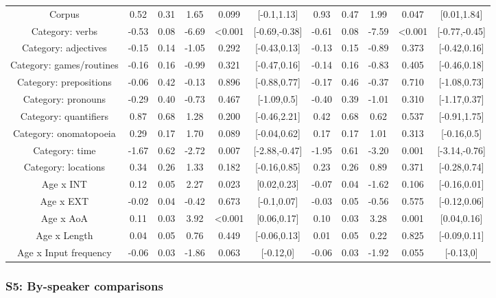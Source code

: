 \documentclass[
  man,floatsintext]{apa6}
\begin{document}
\begin{longtable}[t]{ccccccccccc}
Corpus & 0.52 & 0.31 & 1.65 & 0.099 & {}[-0.1,1.13] & 0.93 & 0.47 & 1.99 & 0.047 & {}[0.01,1.84]\\
Category: verbs & -0.53 & 0.08 & -6.69 & <0.001 & {}[-0.69,-0.38] & -0.61 & 0.08 & -7.59 & <0.001 & {}[-0.77,-0.45]\\
Category: adjectives & -0.15 & 0.14 & -1.05 & 0.292 & {}[-0.43,0.13] & -0.13 & 0.15 & -0.89 & 0.373 & {}[-0.42,0.16]\\
\addlinespace
Category: games/routines & -0.16 & 0.16 & -0.99 & 0.321 & {}[-0.47,0.16] & -0.14 & 0.16 & -0.83 & 0.405 & {}[-0.46,0.18]\\
Category: prepositions & -0.06 & 0.42 & -0.13 & 0.896 & {}[-0.88,0.77] & -0.17 & 0.46 & -0.37 & 0.710 & {}[-1.08,0.73]\\
Category: pronouns & -0.29 & 0.40 & -0.73 & 0.467 & {}[-1.09,0.5] & -0.40 & 0.39 & -1.01 & 0.310 & {}[-1.17,0.37]\\
Category: quantifiers & 0.87 & 0.68 & 1.28 & 0.200 & {}[-0.46,2.21] & 0.42 & 0.68 & 0.62 & 0.537 & {}[-0.91,1.75]\\
Category: onomatopoeia & 0.29 & 0.17 & 1.70 & 0.089 & {}[-0.04,0.62] & 0.17 & 0.17 & 1.01 & 0.313 & {}[-0.16,0.5]\\
\addlinespace
Category: time & -1.67 & 0.62 & -2.72 & 0.007 & {}[-2.88,-0.47] & -1.95 & 0.61 & -3.20 & 0.001 & {}[-3.14,-0.76]\\
Category: locations & 0.34 & 0.26 & 1.33 & 0.182 & {}[-0.16,0.85] & 0.23 & 0.26 & 0.89 & 0.371 & {}[-0.28,0.74]\\
Age x INT & 0.12 & 0.05 & 2.27 & 0.023 & {}[0.02,0.23] & -0.07 & 0.04 & -1.62 & 0.106 & {}[-0.16,0.01]\\
Age x EXT & -0.02 & 0.04 & -0.42 & 0.673 & {}[-0.1,0.07] & -0.03 & 0.05 & -0.56 & 0.575 & {}[-0.12,0.06]\\
Age x AoA & 0.11 & 0.03 & 3.92 & <0.001 & {}[0.06,0.17] & 0.10 & 0.03 & 3.28 & 0.001 & {}[0.04,0.16]\\
\addlinespace
Age x Length & 0.04 & 0.05 & 0.76 & 0.449 & {}[-0.06,0.13] & 0.01 & 0.05 & 0.22 & 0.825 & {}[-0.09,0.11]\\
Age x Input frequency & -0.06 & 0.03 & -1.86 & 0.063 & {}[-0.12,0] & -0.06 & 0.03 & -1.92 & 0.055 & {}[-0.13,0]\\
\bottomrule
\end{longtable}
\endgroup{}

\newpage

\hypertarget{s5-by-speaker-comparisons}{%
\subsubsection{S5: By-speaker comparisons}\label{s5-by-speaker-comparisons}}
\end{document}
